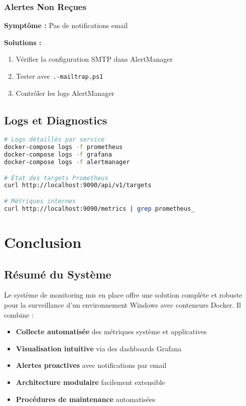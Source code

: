\documentclass[12pt,a4paper]{report}
\newcommand{\code}[1]{\texttt{\color{primaryblue}#1}}
\begin{document}
\begin{table}[H]
\begin{itemize}
\begin{table}[H]
\subsection{Alertes Non Reçues}

\textbf{Symptôme :} Pas de notifications email

\textbf{Solutions :}
\begin{enumerate}
    \item Vérifier la configuration SMTP dans AlertManager
    \item Tester avec \code{.\scripts\test-mailtrap.ps1}
    \item Contrôler les logs AlertManager
\end{enumerate}

\section{Logs et Diagnostics}

\begin{lstlisting}[language=bash, caption=Commandes de diagnostic]
# Logs détaillés par service
docker-compose logs -f prometheus
docker-compose logs -f grafana
docker-compose logs -f alertmanager

# État des targets Prometheus
curl http://localhost:9090/api/v1/targets

# Métriques internes
curl http://localhost:9090/metrics | grep prometheus_
\end{lstlisting}

\chapter{Conclusion}

\section{Résumé du Système}

Le système de monitoring mis en place offre une solution complète et robuste pour la surveillance d'un environnement Windows avec conteneurs Docker. Il combine :

\begin{itemize}
    \item \textbf{Collecte automatisée} des métriques système et applicatives
    \item \textbf{Visualisation intuitive} via des dashboards Grafana
    \item \textbf{Alertes proactives} avec notifications par email
    \item \textbf{Architecture modulaire} facilement extensible
    \item \textbf{Procédures de maintenance} automatisées
\end{itemize}


\end{table}
\end{itemize}
\end{table}
\end{document}
